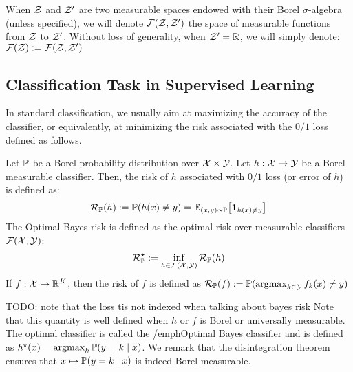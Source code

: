 When $\mathcal{Z}$ and $\mathcal{Z}'$ are two measurable spaces endowed with their Borel $\sigma$-algebra (unless specified), we will denote $\mathcal{F}(\mathcal{Z},\mathcal{Z}')$ the space of measurable functions from $\mathcal{Z}$ to $\mathcal{Z}'$. Without loss of generality, when $\mathcal{Z}'=\mathbb{R}$, we will simply denote: $\mathcal{F}(\mathcal{Z}):=\mathcal{F}(\mathcal{Z},\mathcal{Z}')$ 




\subsection{Classification Task in Supervised Learning}


In standard classification, we usually aim at maximizing the accuracy of the classifier, or equivalently, at minimizing the risk associated with the $0/1$ loss defined as follows.

    
\begin{definition} Let $\mathbb{P}$ be a Borel probability distribution over $\mathcal{X}\times\mathcal{Y}$. Let $h:\mathcal{X}\to\mathcal{Y}$ be a Borel measurable classifier. Then, the risk of $h$ associated with $0/1$ loss (or error of $h$) is defined as:
\begin{align}
   \risk_{\PP}(h):=\PP(h(x)\neq y) = \EE_{(x,y)\sim\PP}\left[\mathbf{1}_{h(x)\neq y}\right]
\end{align}
The Optimal Bayes risk is defined as the optimal risk over measurable classifiers $\mathcal{F}(\mathcal{X},\mathcal{Y})$:
\begin{align}
    \mathcal{R}^\star_{\mathbb{P}}:=\inf_{h\in\mathcal{F}(\mathcal{X},\mathcal{Y})}\mathcal{R}_{\mathbb{P}}(h)
 \end{align}
If $f:\mathcal{X}\to\mathbb{R}^K$, then the risk of $f$ is defined as $\mathcal{R}_{\mathbb{P}}(f):=\mathbb{P}(\operatorname*{argmax}_{k\in\mathcal{Y}}f_k(x)\neq y)$
\end{definition}
TODO:  note that the loss tis not indexed when talking about bayes risk
Note that this quantity is well defined when $h$ or $f$ is Borel or universally measurable. The optimal classifier is called the /emph{Optimal Bayes  classifier} and is defined as $h^\star(x) = \operatorname*{argmax}_k\mathbb{P}(y=k\mid x)$. We remark that the disintegration theorem ensures that $x\mapsto \mathbb{P}(y=k\mid x)$ is indeed Borel measurable. 

